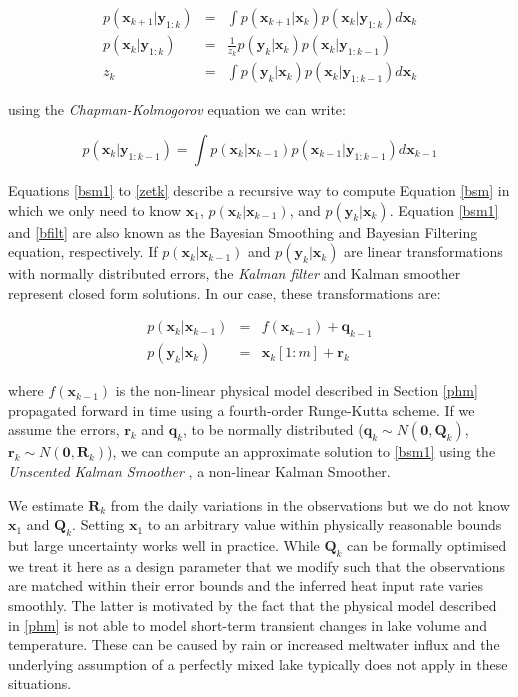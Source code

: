 \documentclass{bmcart}
\newcommand{\bm}[1]{{\textbf{#1}}}
\begin{document}
\begin{eqnarray}\label{bfilt1}
p(\bm{x}_{k+1}|\bm{y}_{1:k}) & = & \int p(\bm{x}_{k+1}|\bm{x}_k)p(\bm{x}_k|\bm{y}_{1:k})d\bm{x}_k \\
        \label{bfilt}
    p(\bm{x}_k|\bm{y}_{1:k}) & = & \frac{1}{z_k} p(\bm{y}_k|\bm{x}_k)p(\bm{x}_k|\bm{y}_{1:k-1}) \\
        \label{zetk}
    z_k & = & \int p(\bm{y}_k|\bm{x}_k) p(\bm{x}_k| \bm{y}_{1:k-1}) d\bm{x}_k  
\end{eqnarray}

using the \textit{Chapman-Kolmogorov} equation
\cite{sarkkaBayesianFilteringSmoothing2013} we can write:

\begin{equation}
p(\bm{x}_k|\bm{y}_{1:k-1}) = \int p(\bm{x}_k|\bm{x}_{k-1})p(\bm{x}_{k-1}|\bm{y}_{1:k-1})d\bm{x}_{k-1} 
\end{equation}

Equations \ref{bsm1} to \ref{zetk} describe a recursive way to compute Equation
\ref{bsm} in which we only need to know $\bm{x}_1$,
$p(\bm{x}_k|\bm{x}_{k-1})$, and $p(\bm{y}_k|\bm{x}_k)$. Equation \ref{bsm1} and
\ref{bfilt} are also known as the Bayesian Smoothing and Bayesian Filtering
equation, respectively. If $p(\bm{x}_k|\bm{x}_{k-1})$ and
$p(\bm{y}_k|\bm{x}_k)$ are linear transformations with normally distributed
errors, the \textit{Kalman filter} \cite{Kalman1960} and Kalman smoother
\cite{Rauch1965} represent closed form solutions. In our case, these
transformations are:

\begin{eqnarray}
p(\bm{x}_k|\bm{x}_{k-1}) & = & f(\bm{x}_{k-1}) + \bm{q}_{k-1} \\
    p(\bm{y}_k|\bm{x}_k) & = & \bm{x}_k[1:m] + \bm{r}_k   
\end{eqnarray}

where $f(\bm{x}_{k-1})$ is the non-linear physical model described in Section
\ref{phm} propagated forward in time using a fourth-order Runge-Kutta scheme. If
we assume the errors, $\bm{r}_k$ and $\bm{q}_{k}$, to be normally distributed
($\bm{q}_{k} \sim N(\bm{0}, \bm{Q}_{k})$, $\bm{r}_k \sim N(\bm{0}, \bm{R}_k)$),
we can compute an approximate solution to \ref{bsm1} using the \textit{Unscented
Kalman Smoother} \citep{Merwe2004, sarkkaBayesianFilteringSmoothing2013}, a
non-linear Kalman Smoother.

We estimate $\bm{R}_k$ from the daily variations in the observations but we do
not know $\bm{x}_1$ and $\bm{Q}_{k}$. Setting $\bm{x}_1$ to an arbitrary value
within physically reasonable bounds but large uncertainty works well in
practice. While $\bm{Q}_{k}$ can be formally optimised we treat it here as a
design parameter that we modify such that the observations are matched within
their error bounds and the inferred heat input rate varies smoothly. The latter
is motivated by the fact that the physical model described in \ref{phm} is not
able to model short-term transient changes in lake volume and temperature. These
can be caused by rain or increased meltwater influx and the underlying
assumption of a perfectly mixed lake typically does not apply in these
situations.
\end{document}
